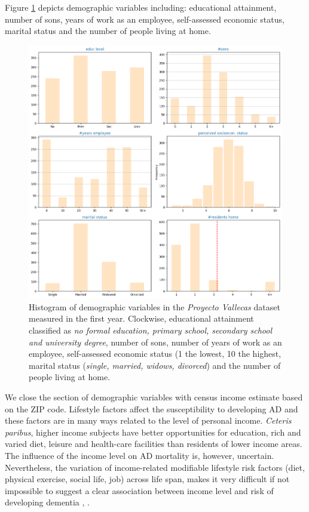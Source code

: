 \documentclass[11pt]{article}
\theoremstyle{definition}
\theoremstyle{remark}
\begin{document}
Figure \ref{fig:demo} depicts demographic variables including: educational attainment, number of sons, years of work as an employee, self-assessed economic status, marital status and the number of people living at home.
\begin{figure}[H]
        \centering
        \includegraphics[keepaspectratio, width=\linewidth]{figures/Fig_demo}
        \caption{Histogram of demographic variables in the \emph{Proyecto Vallecas} dataset measured in the first year. Clockwise, educational attainment classified as \emph{no formal education, primary school, secondary school and university degree}, number of sons, number of years of work as an employee, self-assessed economic status (1 the lowest, 10 the highest, marital status (\emph{single, married, widows, divorced}) and the number of people living at home.} 
        \label{fig:demo}
\end{figure}

We close the section of demographic variables with census income estimate based on the ZIP code. Lifestyle factors affect the susceptibility to developing AD and these factors are in many ways related to the level of personal income. \emph{Ceteris paribus}, higher income subjects have better opportunities for education, rich and varied diet, leisure and health-care facilities than residents of lower income areas. The influence of the income level on AD mortality is, however, uncertain. Nevertheless, the variation of income-related modifiable lifestyle risk factors (diet, physical exercise, social life, job) across life span, makes it very difficult if not impossible to suggest a clear association between income level and risk of developing dementia \cite{stkepkowski2015correlation}, \cite{ferri2017dementia}.
\end{document}
